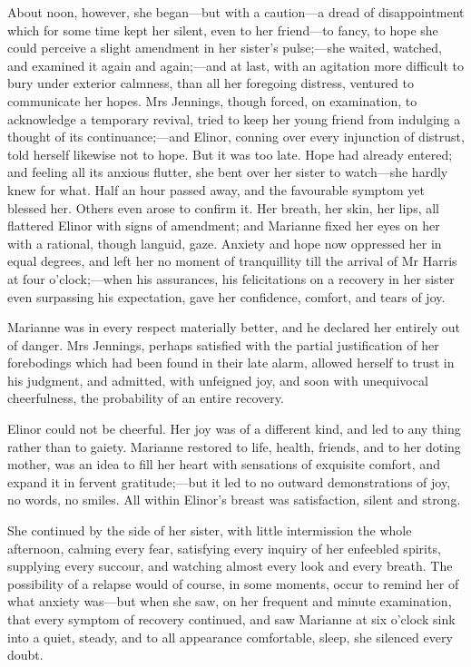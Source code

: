 About noon, however, she began—but with a caution—a dread of disappointment which for some time kept her silent, even to her friend—to fancy, to hope she could perceive a slight amendment in her sister's pulse;—she waited, watched, and examined it again and again;—and at last, with an agitation more difficult to bury under exterior calmness, than all her foregoing distress, ventured to communicate her hopes. Mrs Jennings, though forced, on examination, to acknowledge a temporary revival, tried to keep her young friend from indulging a thought of its continuance;—and Elinor, conning over every injunction of distrust, told herself likewise not to hope. But it was too late. Hope had already entered; and feeling all its anxious flutter, she bent over her sister to watch—she hardly knew for what. Half an hour passed away, and the favourable symptom yet blessed her. Others even arose to confirm it. Her breath, her skin, her lips, all flattered Elinor with signs of amendment; and Marianne fixed her eyes on her with a rational, though languid, gaze. Anxiety and hope now oppressed her in equal degrees, and left her no moment of tranquillity till the arrival of Mr Harris at four o'clock;—when his assurances, his felicitations on a recovery in her sister even surpassing his expectation, gave her confidence, comfort, and tears of joy.

Marianne was in every respect materially better, and he declared her entirely out of danger. Mrs Jennings, perhaps satisfied with the partial justification of her forebodings which had been found in their late alarm, allowed herself to trust in his judgment, and admitted, with unfeigned joy, and soon with unequivocal cheerfulness, the probability of an entire recovery.

Elinor could not be cheerful. Her joy was of a different kind, and led to any thing rather than to gaiety. Marianne restored to life, health, friends, and to her doting mother, was an idea to fill her heart with sensations of exquisite comfort, and expand it in fervent gratitude;—but it led to no outward demonstrations of joy, no words, no smiles. All within Elinor's breast was satisfaction, silent and strong.

She continued by the side of her sister, with little intermission the whole afternoon, calming every fear, satisfying every inquiry of her enfeebled spirits, supplying every succour, and watching almost every look and every breath. The possibility of a relapse would of course, in some moments, occur to remind her of what anxiety was—but when she saw, on her frequent and minute examination, that every symptom of recovery continued, and saw Marianne at six o'clock sink into a quiet, steady, and to all appearance comfortable, sleep, she silenced every doubt.

